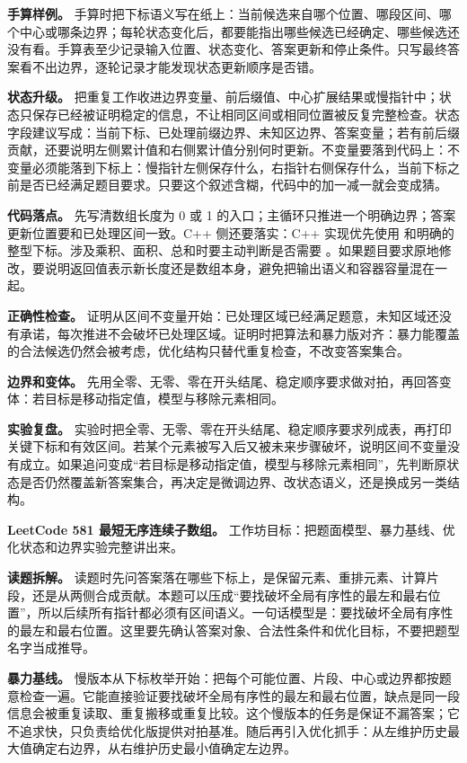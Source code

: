 \textbf{手算样例。} 手算时把下标语义写在纸上：当前候选来自哪个位置、哪段区间、哪个中心或哪条边界；每轮状态变化后，都要能指出哪些候选已经确定、哪些候选还没有看。手算表至少记录输入位置、状态变化、答案更新和停止条件。只写最终答案看不出边界，逐轮记录才能发现状态更新顺序是否错。

\textbf{状态升级。} 把重复工作收进边界变量、前后缀值、中心扩展结果或慢指针中；状态只保存已经被证明稳定的信息，不让相同区间或相同位置被反复完整检查。状态字段建议写成：当前下标、已处理前缀边界、未知区边界、答案变量；若有前后缀贡献，还要说明左侧累计值和右侧累计值分别何时更新。不变量要落到代码上：不变量必须能落到下标上：慢指针左侧保存什么，右指针右侧保存什么，当前下标之前是否已经满足题目要求。只要这个叙述含糊，代码中的加一减一就会变成猜。

\textbf{代码落点。} 先写清数组长度为 0 或 1 的入口；主循环只推进一个明确边界；答案更新位置要和已处理区间一致。C++ 侧还要落实：C++ 实现优先使用  和明确的整型下标。涉及乘积、面积、总和时要主动判断是否需要 。如果题目要求原地修改，要说明返回值表示新长度还是数组本身，避免把输出语义和容器容量混在一起。

\textbf{正确性检查。} 证明从区间不变量开始：已处理区域已经满足题意，未知区域还没有承诺，每次推进不会破坏已处理区域。证明时把算法和暴力版对齐：暴力能覆盖的合法候选仍然会被考虑，优化结构只替代重复检查，不改变答案集合。

\textbf{边界和变体。} 先用全零、无零、零在开头结尾、稳定顺序要求做对拍，再回答变体：若目标是移动指定值，模型与移除元素相同。

\textbf{实验复盘。} 实验时把全零、无零、零在开头结尾、稳定顺序要求列成表，再打印关键下标和有效区间。若某个元素被写入后又被未来步骤破坏，说明区间不变量没有成立。如果追问变成“若目标是移动指定值，模型与移除元素相同”，先判断原状态是否仍然覆盖新答案集合，再决定是微调边界、改状态语义，还是换成另一类结构。

\noindent\textbf{LeetCode 581 最短无序连续子数组。} 工作坊目标：把题面模型、暴力基线、优化状态和边界实验完整讲出来。

\textbf{读题拆解。} 读题时先问答案落在哪些下标上，是保留元素、重排元素、计算片段，还是从两侧合成贡献。本题可以压成“要找破坏全局有序性的最左和最右位置”，所以后续所有指针都必须有区间语义。一句话模型是：要找破坏全局有序性的最左和最右位置。这里要先确认答案对象、合法性条件和优化目标，不要把题型名字当成推导。

\textbf{暴力基线。} 慢版本从下标枚举开始：把每个可能位置、片段、中心或边界都按题意检查一遍。它能直接验证要找破坏全局有序性的最左和最右位置，缺点是同一段信息会被重复读取、重复搬移或重复比较。这个慢版本的任务是保证不漏答案；它不追求快，只负责给优化版提供对拍基准。随后再引入优化抓手：从左维护历史最大值确定右边界，从右维护历史最小值确定左边界。

